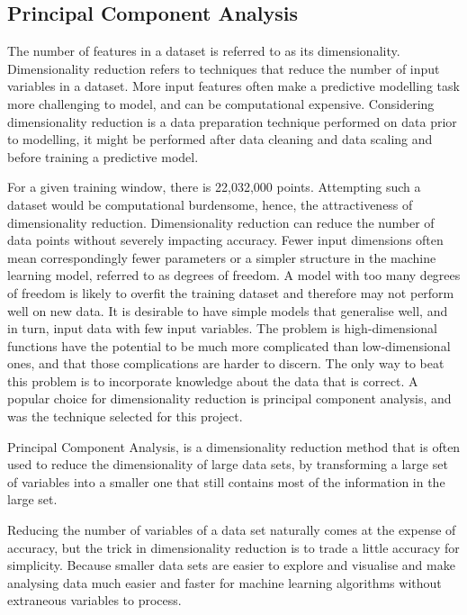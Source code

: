 \subsection{Principal Component Analysis}\label{pca_section}
The number of features in a dataset is referred to as its dimensionality. Dimensionality reduction refers to techniques that reduce the number of input variables in a dataset. More input features often make a predictive modelling task more challenging to model, and can be computational expensive. Considering dimensionality reduction is a data preparation technique performed on data prior to modelling, it might be performed after data cleaning and data scaling and before training a predictive model\cite{dimension_reduction}. 

For a given training window, there is 22,032,000 points. Attempting such a dataset would be computational burdensome, hence, the attractiveness of dimensionality reduction. Dimensionality reduction can reduce the number of data points without severely impacting accuracy. Fewer input dimensions often mean correspondingly fewer parameters or a simpler structure in the machine learning model, referred to as degrees of freedom. A model with too many degrees of freedom is likely to overfit the training dataset and therefore may not perform well on new data. It is desirable to have simple models that generalise well, and in turn, input data with few input variables. The problem is high-dimensional functions have the potential to be much more complicated than low-dimensional ones, and that those complications are harder to discern. The only way to beat this problem is to incorporate knowledge about the data that is correct\cite{dimension_reduction}. A popular choice for dimensionality reduction is principal component analysis, and was the technique selected for this project. 

\begin{definition}
Principal Component Analysis, is a dimensionality reduction method that is often used to reduce the dimensionality of large data sets, by transforming a large set of variables into a smaller one that still contains most of the information in the large set.
\end{definition}

Reducing the number of variables of a data set naturally comes at the expense of accuracy, but the trick in dimensionality reduction is to trade a little accuracy for simplicity. Because smaller data sets are easier to explore and visualise and make analysing data much easier and faster for machine learning algorithms without extraneous variables to process\cite{pca}. 

